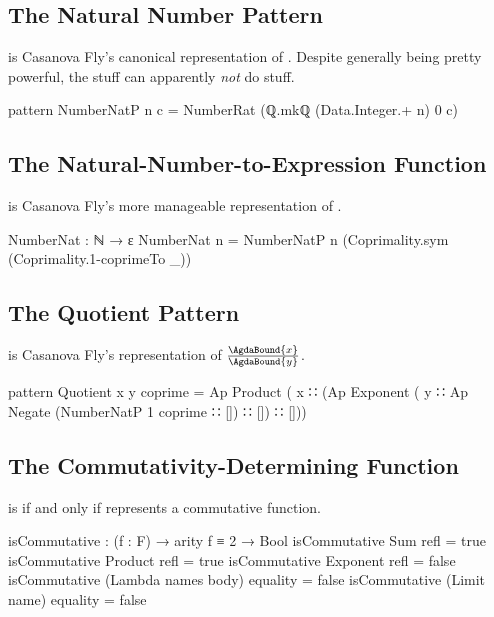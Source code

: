 \documentclass{report}
\begin{document}
\subsection{The Natural Number Pattern}
   is Casanova Fly's canonical representation of .  Despite generally being pretty powerful, the  stuff can apparently \emph{not} do  stuff.

\begin{code}
pattern NumberNatP n c = NumberRat (ℚ.mkℚ (Data.Integer.+ n) 0 c)
\end{code}

\subsection{The Natural-Number-to-Expression Function}
  is Casanova Fly's more manageable representation of .

\begin{code}
NumberNat : ℕ → ε
NumberNat n = NumberNatP n (Coprimality.sym (Coprimality.1-coprimeTo _))
\end{code}

\subsection{The Quotient Pattern}
    is Casanova Fly's representation of \(\frac{\AgdaBound{x}}{\AgdaBound{y}}\).

\begin{code}
pattern Quotient x y coprime =
  Ap Product
     ( x
     ∷ (Ap Exponent
           ( y
           ∷ Ap Negate (NumberNatP 1 coprime ∷ [])
           ∷ [])
     ∷ []))
\end{code}

\subsection{The Commutativity-Determining Function}
   is  if and only if  represents a commutative function.

\begin{code}
isCommutative : (f : F) → arity f ≡ 2 → Bool
isCommutative Sum refl = true
isCommutative Product refl = true
isCommutative Exponent refl = false
isCommutative (Lambda names body) equality = false
isCommutative (Limit name) equality = false
\end{code}
\end{document}
